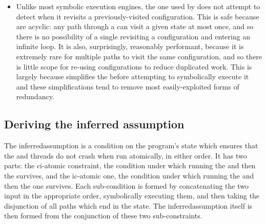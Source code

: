 \begin{itemize}
\item Unlike most symbolic execution engines, the one used by
  {\implementation} does not attempt to detect when it revisits a
  previously-visited configuration.  This is safe because
  {\StateMachines} are acyclic: any path through a {\StateMachine} can
  visit a given state at most once, and so there is no possibility of
  a single revisiting a configuration and entering an infinite loop.
  It is also, surprisingly, reasonably performant, because it is
  extremely rare for multiple paths to visit the same configuration,
  and so there is little scope for re-using configurations to reduce
  duplicated work.  This is largely because {\technique} simplifies
  the {\StateMachine} before attempting to symbolically execute it and
  these simplifications tend to remove most easily-exploited forms of
  redundancy.
\end{itemize}

\subsection{Deriving the inferred assumption}

\label{sect:derive:inferred_assumption}

The \gls{inferredassumption} is a condition on the program's state
which ensures that the  and
 threads do not crash when run
atomically, in either order.  It has two parts: the \gls{ci-atomic}
constraint, the condition under which running the
 {\StateMachine} and then the
 {\StateMachine} survives, and
the \gls{ic-atomic} one, the condition under which running the
 {\StateMachine} and then the
 one survives.  Each sub-condition
is formed by concatenating the two input {\StateMachines} in the
appropriate order, symbolically executing them, and then taking the
disjunction of all paths which end in the {\stSurvive} state.  The
\gls{inferredassumption} itself is then formed from the conjunction of
these two sub-constraints.

